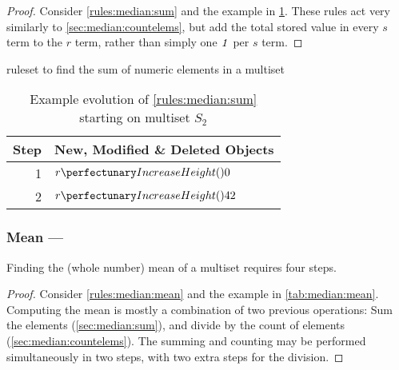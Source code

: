 \begin{proof}
Consider \cref{rules:median:sum} and the example in \cref{tab:median:sum}.  These rules act very similarly to \cref{sec:median:countelems}, but add the total stored value in every \(s\) term to the \(r\) term, rather than simply one \(\mathit{1}\) per \(s\) term.
\end{proof}

\begin{cprulesetfloat} \begin{cpruleset}
\end{cpruleset}
\caption{\label{rules:median:sum}\Gls{ruleset} to find the sum of numeric elements in a multiset}
\end{cprulesetfloat}

\begin{table}[htbp]
\centering
   \begin{tabular}{|r|l|}
    \hline
    \textbf{Step} & \textbf{New, Modified \& Deleted Objects} \\ \hline
    1 & \(\cpfunc{r}{0}\)\\ \hline
    2 & \(\cpfunc{r}{42}\)\\ \hline

\end{tabular}
\caption[Example evolution of \cref{rules:median:sum} to find the sum of numeric elements in a multiset]{\label{tab:median:sum}Example evolution of \cref{rules:median:sum} starting on multiset \(S_2\)}
\end{table}

\subsubsection{Mean --- }\label{sec:median:mean}

\begin{proposition}\label{prop:median:mean}
Finding the (whole number) mean of a multiset requires four steps.
\end{proposition}

\begin{proof}
Consider \cref{rules:median:mean} and the example in \cref{tab:median:mean}.  Computing the mean is mostly a combination of two previous operations:  Sum the elements (\cref{sec:median:sum}), and divide by the count of elements (\cref{sec:median:countelems}).  The summing and counting may be performed simultaneously in two steps, with two extra steps for the division.
\end{proof}

